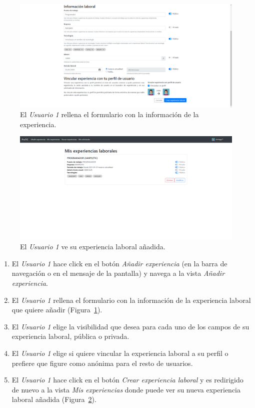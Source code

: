 \documentclass[a4paper, 12pt]{book}
\begin{document}
    \begin{figure}
        \centering
        \includegraphics[width=15cm, keepaspectratio]{img/1.2.png}
        \caption{El \emph{Usuario 1} rellena el formulario con la información de la experiencia.}
        \label{fig:use_cases_1_2}
    \end{figure}

    \begin{figure}
        \centering
        \includegraphics[width=15cm, keepaspectratio]{img/1.3.png}
        \caption{El \emph{Usuario 1} ve su experiencia laboral añadida.}
        \label{fig:use_cases_1_3}
    \end{figure}

    \begin{enumerate}
        \item El \emph{Usuario 1} hace click en el botón \emph{Añadir experiencia}
        (en la barra de navegación o en el mensaje de la pantalla) y navega a la vista \emph{Añadir experiencia}.
        \item El \emph{Usuario 1} rellena el formulario con la información de la experiencia laboral que quiere añadir
        (Figura~\ref{fig:use_cases_1_2}).
        \item El \emph{Usuario 1} elige la visibilidad que desea para cada uno de los campos de su experiencia laboral,
        pública o privada.
        \item El \emph{Usuario 1} elige si quiere vincular la experiencia laboral a su perfil o prefiere
        que figure como anónima para el resto de usuarios.
        \item El \emph{Usuario 1} hace click en el botón \emph{Crear experiencia laboral} y es redirigido de nuevo a la vista
        \emph{Mis experiencias} donde puede ver su nueva experiencia laboral añadida (Figura~\ref{fig:use_cases_1_3}).
    \end{enumerate}
\end{document}

